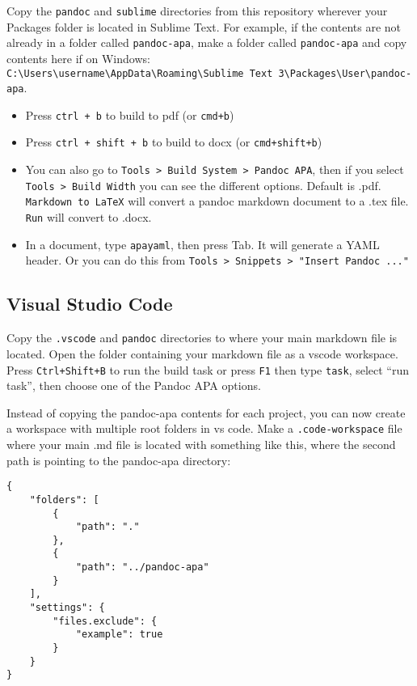 \documentclass[,longtable]{apa6}
\begin{document}
Copy the \texttt{pandoc} and \texttt{sublime} directories from this
repository wherever your Packages folder is located in Sublime Text. For
example, if the contents are not already in a folder called
\texttt{pandoc-apa}, make a folder called \texttt{pandoc-apa} and copy
contents here if on Windows:
\texttt{C:\textbackslash{}Users\textbackslash{}username\textbackslash{}AppData\textbackslash{}Roaming\textbackslash{}Sublime\ Text\ 3\textbackslash{}Packages\textbackslash{}User\textbackslash{}pandoc-apa}.

\begin{itemize}
\item
  Press \texttt{ctrl\ +\ b} to build to pdf (or \texttt{cmd+b})
\item
  Press \texttt{ctrl\ +\ shift\ +\ b} to build to docx (or
  \texttt{cmd+shift+b})
\item
  You can also go to
  \texttt{Tools\ \textgreater{}\ Build\ System\ \textgreater{}\ Pandoc\ APA},
  then if you select \texttt{Tools\ \textgreater{}\ Build\ Width} you
  can see the different options. Default is .pdf.
  \texttt{Markdown\ to\ LaTeX} will convert a pandoc markdown document
  to a .tex file. \texttt{Run} will convert to .docx.
\item
  In a document, type \texttt{apayaml}, then press Tab. It will generate
  a YAML header. Or you can do this from
  \texttt{Tools\ \textgreater{}\ Snippets\ \textgreater{}\ "Insert\ Pandoc\ ..."}
\end{itemize}

\hypertarget{visual-studio-code}{%
\subsection{Visual Studio Code}\label{visual-studio-code}}

Copy the \texttt{.vscode} and \texttt{pandoc} directories to where your
main markdown file is located. Open the folder containing your markdown
file as a vscode workspace. Press \texttt{Ctrl+Shift+B} to run the build
task or press \texttt{F1} then type \texttt{task}, select \enquote{run
task}, then choose one of the Pandoc APA options.

Instead of copying the pandoc-apa contents for each project, you can now
create a workspace with multiple root folders in vs code. Make a
\texttt{.code-workspace} file where your main .md file is located with
something like this, where the second path is pointing to the pandoc-apa
directory:

\begin{verbatim}
{
    "folders": [
        {
            "path": "."
        },
        {
            "path": "../pandoc-apa"
        }
    ],
    "settings": {
        "files.exclude": {
            "example": true
        }
    }
}
\end{verbatim}
\end{document}
